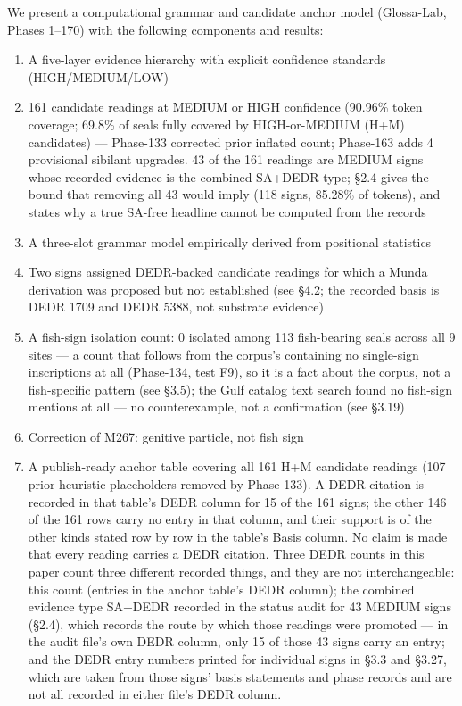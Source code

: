 \documentclass[
]{article}
\providecommand{\tightlist}{%
  \setlength{\itemsep}{0pt}\setlength{\parskip}{0pt}}
\begin{document}
We present a computational grammar and candidate anchor model (Glossa-Lab, Phases 1--170) with the following components and results:

\begin{enumerate}
\def\labelenumi{\arabic{enumi}.}
\tightlist
\item
  A five-layer evidence hierarchy with explicit confidence standards
  (HIGH/MEDIUM/LOW)
\item
  161 candidate readings at MEDIUM or HIGH confidence (90.96\% token coverage; 69.8\% of seals fully covered by HIGH-or-MEDIUM (H+M) candidates) --- Phase-133 corrected prior inflated count; Phase-163 adds 4 provisional sibilant upgrades. 43 of the 161 readings are MEDIUM signs whose recorded evidence is the combined SA+DEDR type; §2.4 gives the bound that removing all 43 would imply (118 signs, 85.28\% of tokens), and states why a true SA-free headline cannot be computed from the records
\item
  A three-slot grammar model empirically derived from positional
  statistics
\item
  Two signs assigned DEDR-backed candidate readings for which a Munda derivation was proposed but not established (see §4.2; the recorded basis is DEDR 1709 and DEDR 5388, not substrate evidence)
\item
  A fish-sign isolation count: 0 isolated among 113 fish-bearing seals across all 9 sites --- a count that follows from the corpus's containing no single-sign inscriptions at all (Phase-134, test F9), so it is a fact about the corpus, not a fish-specific pattern (see §3.5); the Gulf catalog text search found no fish-sign mentions at all --- no counterexample, not a confirmation (see §3.19)
\item
  Correction of M267: genitive particle, not fish sign
\item
  A publish-ready anchor table covering all 161 H+M candidate readings
  (107 prior heuristic placeholders removed by Phase-133). A DEDR citation is recorded in that table's DEDR column for 15 of the 161 signs; the other 146 of the 161 rows carry no entry in that column, and their support is of the other kinds stated row by row in the table's Basis column. No claim is made that every reading carries a DEDR citation. Three DEDR counts in this paper count three different recorded things, and they are not interchangeable: this count (entries in the anchor table's DEDR column); the combined evidence type SA+DEDR recorded in the status audit for 43 MEDIUM signs (§2.4), which records the route by which those readings were promoted --- in the audit file's own DEDR column, only 15 of those 43 signs carry an entry; and the DEDR entry numbers printed for individual signs in §3.3 and §3.27, which are taken from those signs' basis statements and phase records and are not all recorded in either file's DEDR column.

\end{enumerate}
\end{document}
